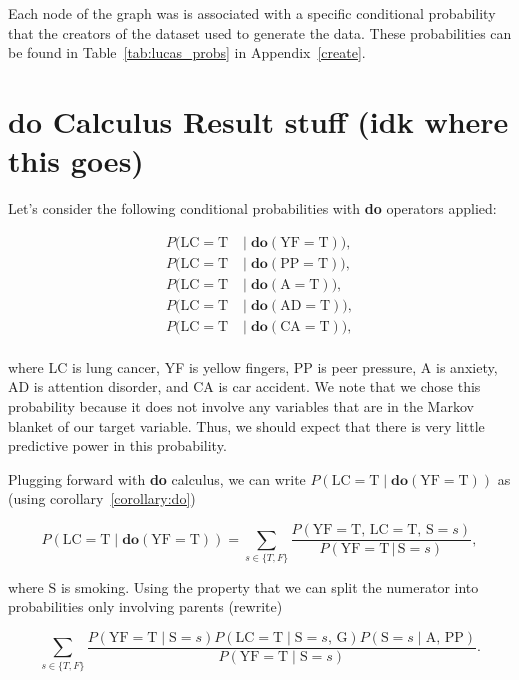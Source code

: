 \documentclass{article}
\begin{document}
Each node of the graph was is associated with a specific conditional probability that the
creators of the dataset used to generate the data. These probabilities can be found in Table~\ref{tab:lucas_probs}
in Appendix~\ref{create}.


\section{do Calculus Result stuff (idk where this goes)}

Let's consider the following conditional probabilities with \textbf{do} operators applied:

\begin{align*}
    P(\text{LC} = \text{T} \;&|\; \textbf{do}(\text{YF} = \text{T})), \\
    P(\text{LC} = \text{T} \;&|\; \textbf{do}(\text{PP} = \text{T})), \\
    P(\text{LC} = \text{T} \;&|\; \textbf{do}(\text{A} = \text{T})), \\
    P(\text{LC} = \text{T} \;&|\; \textbf{do}(\text{AD} = \text{T})), \\
    P(\text{LC} = \text{T} \;&|\; \textbf{do}(\text{CA} = \text{T})), \\
\end{align*}

where LC is lung cancer, YF is yellow fingers, PP is peer pressure, A is anxiety, AD is attention disorder, and CA 
is car accident. We note that we chose this probability because it does not involve any
variables that are in the Markov blanket of our target variable. Thus, we should expect that there is very little
predictive power in this probability.

Plugging forward with \textbf{do} calculus, we can write $P(\text{LC} = \text{T} \;|\; \textbf{do}(\text{YF} = \text{T}))$ as
(using corollary~\ref{corollary:do})

\begin{equation*}
    P(\text{LC} = \text{T} \;|\; \textbf{do}(\text{YF} = \text{T})) = 
    \sum_{s\in\{T, F\}} \frac{P(\text{YF} = \text{T},\, \text{LC} = \text{T},\, \text{S} = s)}{P(\text{YF} = \text{T}\,|\, \text{S} = s)},
\end{equation*}

where $\text{S}$ is smoking. Using the property that we can split the numerator into probabilities only involving parents ({\color{red}rewrite})

\begin{equation*}
    \sum_{s\in\{T, F\}}\frac{P(\text{YF} =\text{T}\;|\; \text{S} = s) P(\text{LC} 
    = \text{T}\;|\; \text{S}=s,\, \text{G}) P(\text{S}=s\;|\;\text{A},\, \text{PP})}
    {P(\text{YF} = \text{T}\;|\; \text{S} = s)}.
\end{equation*}
\end{document}
